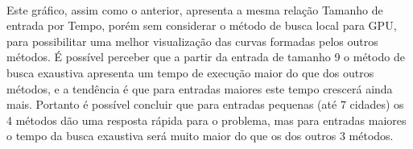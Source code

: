 \documentclass[11pt]{article}
\begin{document}
    \begin{center}
    \end{center}
    { \hspace*{\fill} \\}
    
    Este gráfico, assim como o anterior, apresenta a mesma relação Tamanho
de entrada por Tempo, porém sem considerar o método de busca local para
GPU, para possibilitar uma melhor visualização das curvas formadas pelos
outros métodos. É possível perceber que a partir da entrada de tamanho 9
o método de busca exaustiva apresenta um tempo de execução maior do que
dos outros métodos, e a tendência é que para entradas maiores este tempo
crescerá ainda mais. Portanto é possível concluir que para entradas
pequenas (até 7 cidades) os 4 métodos dão uma resposta rápida para o
problema, mas para entradas maiores o tempo da busca exaustiva será
muito maior do que os dos outros 3 métodos.
\end{document}
